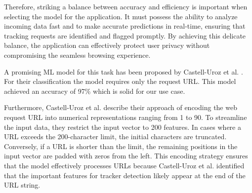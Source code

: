 Therefore, striking a balance between accuracy and efficiency is important when selecting the model for the application. It must possess the ability to analyze incoming data fast and to make accurate predictions
in real-time, ensuring that tracking requests are identified and flagged promptly. By achieving this delicate balance, the application
can effectively protect user privacy without compromising the seamless browsing experience.

A promising ML model for this task has been proposed by Castell-Uroz et al. \cite{castell2020url}.
For their classification the model requires only the request URL. This model 
achieved an accuracy of 97\% which is solid for our use case.

Furthermore, Castell-Uroz et al. describe their approach of encoding the web request URL into numerical
representations ranging from 1 to 90. To streamline the input data, they restrict the input vector to 200 features.
In cases where a URL exceeds the 200-character limit, the initial characters are truncated. Conversely, if a URL
is shorter than the limit, the remaining positions in the input vector are padded with zeros from the left.
This encoding strategy ensures that the model effectively processes URLs because Castell-Uroz et al. identified that the important
features for tracker detection likely appear at the end of the URL string.
